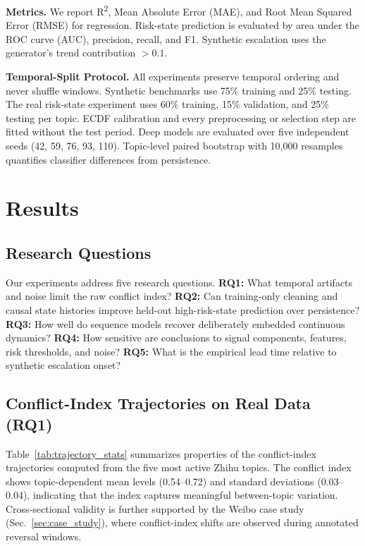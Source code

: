 \documentclass[11pt,a4paper]{article}
\begin{document}
\textbf{Metrics.} We report R\textsuperscript{2}, Mean Absolute Error (MAE), and Root Mean Squared Error (RMSE) for regression. Risk-state prediction is evaluated by area under the ROC curve (AUC), precision, recall, and F1. Synthetic escalation uses the generator's trend contribution $>0.1$.

\textbf{Temporal-Split Protocol.} All experiments preserve temporal ordering and never shuffle windows. Synthetic benchmarks use 75\% training and 25\% testing. The real risk-state experiment uses 60\% training, 15\% validation, and 25\% testing per topic. ECDF calibration and every preprocessing or selection step are fitted without the test period. Deep models are evaluated over five independent seeds (42, 59, 76, 93, 110). Topic-level paired bootstrap with 10,000 resamples quantifies classifier differences from persistence.

\section{Results}

\subsection{Research Questions}

Our experiments address five research questions. \textbf{RQ1:} What temporal artifacts and noise limit the raw conflict index? \textbf{RQ2:} Can training-only cleaning and causal state histories improve held-out high-risk-state prediction over persistence? \textbf{RQ3:} How well do sequence models recover deliberately embedded continuous dynamics? \textbf{RQ4:} How sensitive are conclusions to signal components, features, risk thresholds, and noise? \textbf{RQ5:} What is the empirical lead time relative to synthetic escalation onset?

\subsection{Conflict-Index Trajectories on Real Data (RQ1)}

Table~\ref{tab:trajectory_stats} summarizes properties of the conflict-index trajectories computed from the five most active Zhihu topics. The conflict index shows topic-dependent mean levels (0.54--0.72) and standard deviations (0.03--0.04), indicating that the index captures meaningful between-topic variation. Cross-sectional validity is further supported by the Weibo case study (Sec.~\ref{sec:case_study}), where conflict-index shifts are observed during annotated reversal windows.
\end{document}
